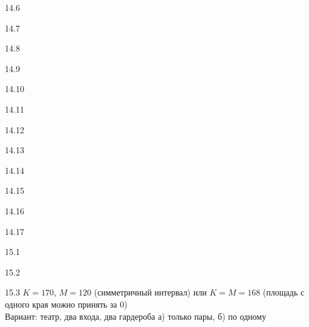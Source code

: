 \protect \hypertarget {soln:14.6}{}
\begin{solution}{{14.6}}
\end{solution}
\protect \hypertarget {soln:14.7}{}
\begin{solution}{{14.7}}
\end{solution}
\protect \hypertarget {soln:14.8}{}
\begin{solution}{{14.8}}
\end{solution}
\protect \hypertarget {soln:14.9}{}
\begin{solution}{{14.9}}
\end{solution}
\protect \hypertarget {soln:14.10}{}
\begin{solution}{{14.10}}
\end{solution}
\protect \hypertarget {soln:14.11}{}
\begin{solution}{{14.11}}
\end{solution}
\protect \hypertarget {soln:14.12}{}
\begin{solution}{{14.12}}
\end{solution}
\protect \hypertarget {soln:14.13}{}
\begin{solution}{{14.13}}
\end{solution}
\protect \hypertarget {soln:14.14}{}
\begin{solution}{{14.14}}
\end{solution}
\protect \hypertarget {soln:14.15}{}
\begin{solution}{{14.15}}
\end{solution}
\protect \hypertarget {soln:14.16}{}
\begin{solution}{{14.16}}
\end{solution}
\protect \hypertarget {soln:14.17}{}
\begin{solution}{{14.17}}
\end{solution}
\protect \hypertarget {soln:15.1}{}
\begin{solution}{{15.1}}
\end{solution}
\protect \hypertarget {soln:15.2}{}
\begin{solution}{{15.2}}
\end{solution}
\protect \hypertarget {soln:15.3}{}
\begin{solution}{{15.3}}
  $K=170$, $M=120$ (симметричный интервал) или $K=M=168$ (площадь с одного края можно принять за 0) \\
  Вариант: театр, два входа, два гардероба а) только пары, б) по одному
\end{solution}
\protect \hypertarget {soln:15.4}{}
